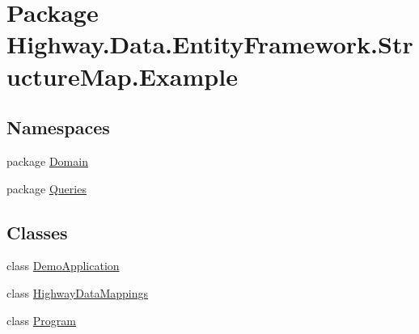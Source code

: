 \hypertarget{namespace_highway_1_1_data_1_1_entity_framework_1_1_structure_map_1_1_example}{\section{Package Highway.\-Data.\-Entity\-Framework.\-Structure\-Map.\-Example}
\label{namespace_highway_1_1_data_1_1_entity_framework_1_1_structure_map_1_1_example}
}
\subsection*{Namespaces}
\begin{DoxyCompactItemize}
\item 
package \hyperlink{namespace_highway_1_1_data_1_1_entity_framework_1_1_structure_map_1_1_example_1_1_domain}{Domain}
\item 
package \hyperlink{namespace_highway_1_1_data_1_1_entity_framework_1_1_structure_map_1_1_example_1_1_queries}{Queries}
\end{DoxyCompactItemize}
\subsection*{Classes}
\begin{DoxyCompactItemize}
\item 
class \hyperlink{class_highway_1_1_data_1_1_entity_framework_1_1_structure_map_1_1_example_1_1_demo_application}{Demo\-Application}
\item 
class \hyperlink{class_highway_1_1_data_1_1_entity_framework_1_1_structure_map_1_1_example_1_1_highway_data_mappings}{Highway\-Data\-Mappings}
\item 
class \hyperlink{class_highway_1_1_data_1_1_entity_framework_1_1_structure_map_1_1_example_1_1_program}{Program}
\end{DoxyCompactItemize}
